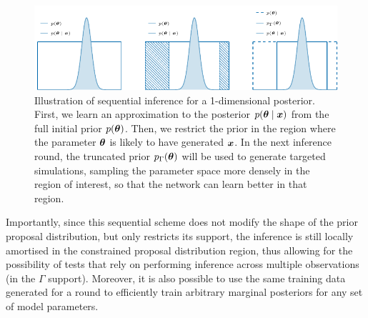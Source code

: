 \begin{figure}
	\centering
	\includegraphics[width=\linewidth]{TikZ/truncation.pdf}
	\caption{Illustration of sequential inference for a 1-dimensional posterior. First, we learn an approximation to the posterior $p(\bm{\theta}\mid\bm{x})$ from the full initial prior $p(\bm{\theta})$. Then, we restrict the prior in the region where the parameter $\bm{\theta}$ is likely to have generated $\bm{x}$. In the next inference round, the truncated prior $p_\Gamma(\bm{\theta})$ will be used to generate targeted simulations, sampling the parameter space more densely in the region of interest, so that the network can learn better in that region.}
	\label{fig:sbi-truncation}
\end{figure}

Importantly, since this sequential scheme does not modify the shape of the prior proposal distribution, but only restricts its support, the inference is still locally amortised in the constrained proposal distribution region, thus allowing for the possibility of tests that rely on performing inference across multiple observations (in the $\Gamma$ support). Moreover, it is also possible to use the same training data generated for a round to efficiently train arbitrary marginal posteriors for any set of model parameters. 

